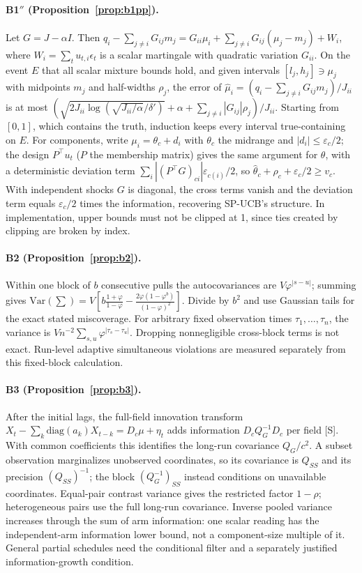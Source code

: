 \documentclass[11pt]{article}
\theoremstyle{definition}
\theoremstyle{remark}
\newcommand{\Var}{\mathrm{Var}}
\newcommand{\src}[1]{\textsf{[#1]}}
\begin{document}
\paragraph{B1$''$ (Proposition~\ref{prop:b1pp}).} Let $G=J-\alpha I$. Then $q_i-\sum_{j\ne i}G_{ij}m_j=G_{ii}\mu_i+\sum_{j\ne i}G_{ij}(\mu_j-m_j)+W_i$, where $W_i=\sum_tu_{t,i}\epsilon_t$ is a scalar martingale with quadratic variation $G_{ii}$. On the event $E$ that all scalar mixture bounds hold, and given intervals $[l_j,h_j]\ni\mu_j$ with midpoints $m_j$ and half-widths $\rho_j$, the error of $\hat\mu_i=(q_i-\sum_{j\ne i}G_{ij}m_j)/J_{ii}$ is at most $(\sqrt{2J_{ii}\log(\sqrt{J_{ii}/\alpha}/\delta')}+\alpha+\sum_{j\ne i}|G_{ij}|\rho_j)/J_{ii}$. Starting from $[0,1]$, which contains the truth, induction keeps every interval true-containing on $E$. For components, write $\mu_i=\theta_c+d_i$ with $\theta_c$ the midrange and $|d_i|\le\varepsilon_c/2$; the design $P^\top u_t$ ($P$ the membership matrix) gives the same argument for $\theta$, with a deterministic deviation term $\sum_i|(P^\top G)_{ci}|\varepsilon_{c(i)}/2$, so $\hat\theta_c+\rho_c+\varepsilon_c/2\ge v_c$. With independent shocks $G$ is diagonal, the cross terms vanish and the deviation term equals $\varepsilon_c/2$ times the information, recovering SP-UCB's structure. In implementation, upper bounds must not be clipped at 1, since ties created by clipping are broken by index.

\paragraph{B2 (Proposition~\ref{prop:b2}).} Within one block of $b$ consecutive pulls the autocovariances are $V\varphi^{|s-u|}$; summing gives $\Var(\sum)=V[b\frac{1+\varphi}{1-\varphi}-\frac{2\varphi(1-\varphi^b)}{(1-\varphi)^2}]$. Divide by $b^2$ and use Gaussian tails for the exact stated miscoverage. For arbitrary fixed observation times $\tau_1,\ldots,\tau_n$, the variance is $Vn^{-2}\sum_{s,u}\varphi^{|\tau_s-\tau_u|}$. Dropping nonnegligible cross-block terms is not exact. Run-level adaptive simultaneous violations are measured separately from this fixed-block calculation.

\paragraph{B3 (Proposition~\ref{prop:b3}).} After the initial lags, the full-field innovation transform $X_t-\sum_k\mathrm{diag}(a_k)X_{t-k}=D_c\mu+\eta_t$ adds information $D_cQ_G^{-1}D_c$ per field \src{S}. With common coefficients this identifies the long-run covariance $Q_G/c^2$. A subset observation marginalizes unobserved coordinates, so its covariance is $Q_{SS}$ and its precision $(Q_{SS})^{-1}$; the block $(Q_G^{-1})_{SS}$ instead conditions on unavailable coordinates. Equal-pair contrast variance gives the restricted factor $1-\rho$; heterogeneous pairs use the full long-run covariance. Inverse pooled variance increases through the sum of arm information: one scalar reading has the independent-arm information lower bound, not a component-size multiple of it. General partial schedules need the conditional filter and a separately justified information-growth condition.
\end{document}
